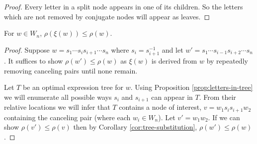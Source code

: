 \documentclass[12pt]{thesis}
\begin{document}
\begin{proof}
    Every letter in a split node appears in
    one of its children.
    So the letters which are not removed by conjugate nodes
    will appear as leaves.
\end{proof}

\begin{theorem}
    \label{thm:invariant-free-reduction}
    For $w \in W_{n}$, $\rho(\xi(w)) \leq \rho(w)$.
\end{theorem}

\begin{proof}
Suppose $w = s_{1} \cdots s_{i}s_{i+1} \cdots s_{n}$ 
where $s_{i} = s_{i+1}^{-1}$
and let $w' = s_{1} \cdots s_{i-1}s_{i+2}\cdots s_{n}$.
It suffices to show $\rho(w') \leq \rho(w)$
as $\xi(w)$ is derived from $w$ by repeatedly
removing canceling pairs until none remain.

Let $T$ be an optimal expression tree for $w$.
Using Proposition \ref{prop:letters-in-tree}
we will enumerate all possible ways $s_{i}$
and $s_{i+1}$ can appear in $T$.
From their relative locations we will infer that $T$ contains
    a node of interest, $v = w_{1}s_{i} s_{i+1}w_{2}$
    containing the canceling pair (where each $w_{i} \in W_{n}$).
Let $v' = w_{1}w_{2}$. 
If we can show $\rho(v') \leq \rho(v)$
    then by Corollary \ref{cor:tree-substitution}, $\rho(w') \leq \rho(w)$.


\end{proof}
\end{document}
